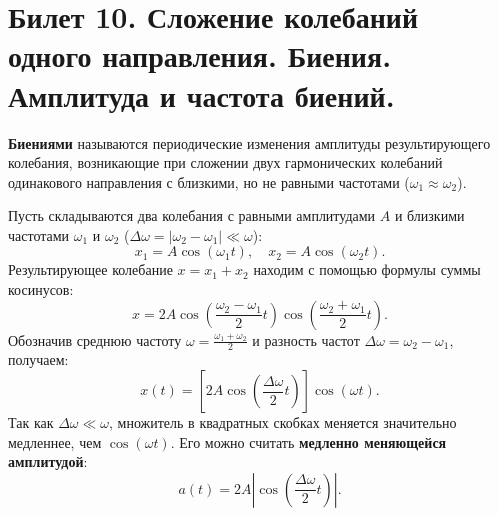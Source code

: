 \section{Билет 10. Сложение колебаний одного направления. Биения. Амплитуда и частота биений.}

\begin{definition}
\textbf{Биениями} называются периодические изменения амплитуды результирующего колебания, возникающие при сложении двух гармонических колебаний одинакового направления с близкими, но не равными частотами ($\omega_1 \approx \omega_2$).
\end{definition}

\begin{theorem}
Пусть складываются два колебания с равными амплитудами $A$ и близкими частотами $\omega_1$ и $\omega_2$ ($\Delta\omega = |\omega_2 - \omega_1| \ll \omega$):
\begin{equation}
    x_1 = A \cos(\omega_1 t), \quad x_2 = A \cos(\omega_2 t).
\end{equation}
Результирующее колебание $x = x_1 + x_2$ находим с помощью формулы суммы косинусов:
\begin{equation}
    x = 2A \cos\left(\frac{\omega_2 - \omega_1}{2}t\right) \cos\left(\frac{\omega_2 + \omega_1}{2}t\right).
\end{equation}
Обозначив среднюю частоту $\omega = \frac{\omega_1 + \omega_2}{2}$ и разность частот $\Delta\omega = \omega_2 - \omega_1$, получаем:
\begin{equation}
    x(t) = \left[ 2A \cos\left(\frac{\Delta\omega}{2}t\right) \right] \cos(\omega t). \label{eq:beats}
\end{equation}
Так как $\Delta\omega \ll \omega$, множитель в квадратных скобках меняется значительно медленнее, чем $\cos(\omega t)$. Его можно считать \textbf{медленно меняющейся амплитудой}:
\begin{equation}
    a(t) = 2A \left| \cos\left(\frac{\Delta\omega}{2}t\right) \right|. \label{eq:beat_amplitude}
\end{equation}
\end{theorem}

